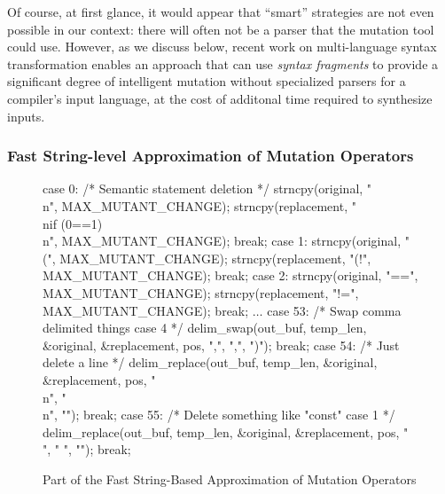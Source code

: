Of course, at first
glance, it would appear that  ``smart'' strategies are not even
possible in our context: there will often not be a parser that the
mutation tool could use.  However, as we discuss below, recent work on
multi-language syntax transformation enables an approach that can use
\emph{syntax fragments} to provide a significant degree of intelligent
mutation without specialized parsers for a compiler's input language,
at the cost of additonal time required to synthesize inputs.

\subsubsection{Fast String-level Approximation of Mutation Operators}
\label{strat-fast-string-level}

\begin{figure}
{\scriptsize
  \begin{code}
case 0: /* Semantic statement deletion */
    strncpy(original, "\\n", MAX\_MUTANT\_CHANGE);
    strncpy(replacement, "\\nif (0==1)\\n", MAX\_MUTANT\_CHANGE);
    break;
case 1:
    strncpy(original, "(", MAX\_MUTANT\_CHANGE);
    strncpy(replacement, "(!", MAX\_MUTANT\_CHANGE);
    break;
case 2:
    strncpy(original, "==", MAX\_MUTANT\_CHANGE);
    strncpy(replacement, "!=", MAX\_MUTANT\_CHANGE);
    break;
$\ldots$
case 53: /* Swap comma delimited things case 4 */
   delim\_swap(out\_buf, temp\_len, \&original, \&replacement, pos,
                         ",", ",", ")");
    break;
case 54: /* Just delete a line */
    delim\_replace(out\_buf, temp\_len, \&original, \&replacement,
                             pos, "\\n", "\\n", "");
    break;
case 55: /* Delete something like "const" case 1 */
    delim\_replace(out\_buf, temp\_len, \&original, \&replacement,
                             pos, " ", " ", "");
    break;    
 \end{code}
    }
 \caption{Part of the Fast String-Based Approximation of Mutation
   Operators}
     \label{fig:foperators}

\end{figure}

